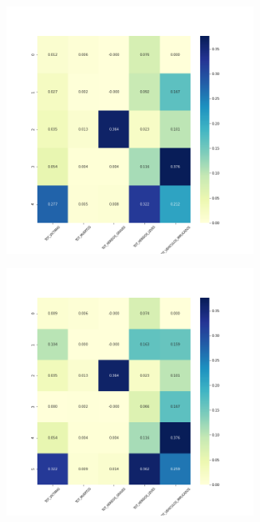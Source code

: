 \begin{figure}[H]
\begin{subfigure}{.5\textwidth}
\end{subfigure}
\begin{subfigure}{.5\textwidth}
  \centering
  \includegraphics[width=0.9\textwidth]{imagenes/case2/kmeans/heatmaps/hm_kmeans_case2_entrada_k5.png}
\end{subfigure}
\begin{subfigure}{.5\textwidth}
  \centering
  \includegraphics[width=0.9\textwidth]{imagenes/case2/kmeans/heatmaps/hm_kmeans_case2_entrada_k6.png}

\end{subfigure}
\end{figure}
